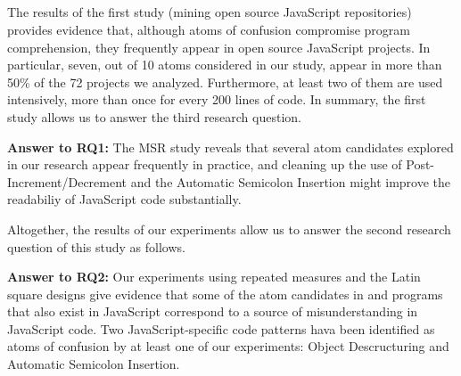   

\subsection{}


The results of the first study (mining open source
JavaScript repositories) provides evidence that,
although atoms of confusion compromise program
comprehension, they frequently appear in open
source JavaScript projects. In particular,
seven, out of 10 atoms considered
  in our study, appear in more than 50\% of
the 72 projects we analyzed. Furthermore, at least two of them are used intensively, more than once for every 200 lines of code. In summary, the first study
allows us to answer the third research
question.


\begin{mh}
  {\bf Answer to RQ1:} The MSR study reveals that
  several atom candidates explored in our research
  appear frequently in practice, and cleaning up the use of 
  Post-Increment/Decrement and the Automatic Semicolon Insertion
  might improve the readabiliy of JavaScript code substantially. 
\end{mh}

Altogether, the results of our experiments allow us
to answer the second research question of this
study as follows. 


\begin{mh}
  {\bf Answer to RQ2:} Our experiments using repeated measures and the Latin square designs give evidence that some of
  the atom candidates in \clang and \cpplang programs that also exist in JavaScript correspond to a source of misunderstanding in
  JavaScript code. Two JavaScript-specific code patterns hava been identified as atoms of confusion by at least
  one of our experiments: Object Descructuring and Automatic Semicolon Insertion. 
\end{mh}

